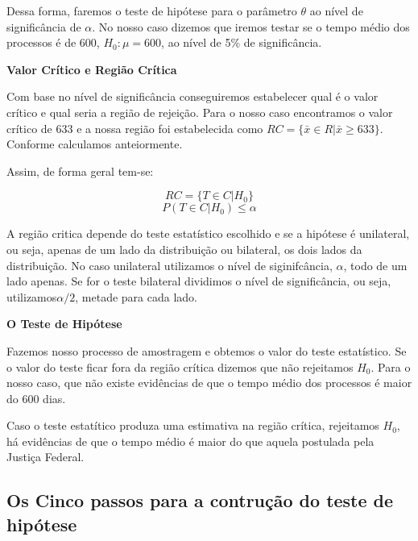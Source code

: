 \documentclass[
  letterpaper,
  DIV=11,
  numbers=noendperiod]{scrreprt}
\begin{document}
Dessa forma, faremos o teste de hipótese para o parâmetro \(\theta\) ao
nível de significância de \(\alpha\). No nosso caso dizemos que iremos
testar se o tempo médio dos processos é de 600, \(H_0: \mu=600\), ao
nível de 5\% de significância.

\textbf{Valor Crítico e Região Crítica}

Com base no nível de significância conseguiremos estabelecer qual é o
valor crítico e qual seria a região de rejeição. Para o nosso caso
encontramos o valor crítico de 633 e a nossa região foi estabelecida
como \(RC =\{\bar{x} \in R | \bar{x} \geq 633\}\). Conforme calculamos
anteiormente.

Assim, de forma geral tem-se:

\[RC =\{T \in C| H_0\}\] \[P(T \in C|H_0)\leq\alpha\]

\begin{tcolorbox}[enhanced jigsaw, titlerule=0mm, colback=white, coltitle=black, opacityback=0, breakable, colbacktitle=quarto-callout-warning-color!10!white, toprule=.15mm, colframe=quarto-callout-warning-color-frame, toptitle=1mm, bottomtitle=1mm, opacitybacktitle=0.6, left=2mm, arc=.35mm, rightrule=.15mm, bottomrule=.15mm, leftrule=.75mm, title=\textcolor{quarto-callout-warning-color}{\faExclamationTriangle}\hspace{0.5em}{Teste Unilateral e Bilateral}]

A região critica depende do teste estatístico escolhido e se a hipótese
é unilateral, ou seja, apenas de um lado da distribuição ou bilateral,
os dois lados da distribuição. No caso unilateral utilizamos o nível de
siginifcância, \(\alpha\), todo de um lado apenas. Se for o teste
bilateral dividimos o nível de significância, ou seja,
utilizamos\(\alpha /2\), metade para cada lado.

\end{tcolorbox}

\textbf{O Teste de Hipótese}

Fazemos nosso processo de amostragem e obtemos o valor do teste
estatístico. Se o valor do teste ficar fora da região crítica dizemos
que não rejeitamos \(H_0\). Para o nosso caso, que não existe evidências
de que o tempo médio dos processos é maior do 600 dias.

Caso o teste estatítico produza uma estimativa na região crítica,
rejeitamos \(H_0\), há evidências de que o tempo médio é maior do que
aquela postulada pela Justiça Federal.

\subsection{Os Cinco passos para a contrução do teste de
hipótese}\label{os-cinco-passos-para-a-contruuxe7uxe3o-do-teste-de-hipuxf3tese}
\end{document}

